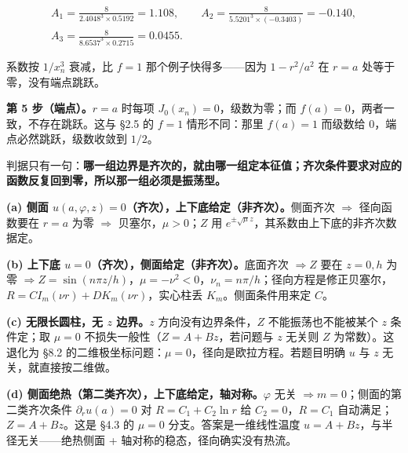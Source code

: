 \documentclass[11pt]{ctexart}
\begin{document}
\begin{gather*}
A_1=\frac{8}{2.4048^3\times0.5192}=1.108,\qquad
A_2=\frac{8}{5.5201^3\times(-0.3403)}=-0.140,\\
A_3=\frac{8}{8.6537^3\times0.2715}=0.0455 .
\end{gather*}

系数按 $1/x_n^3$ 衰减，比 $f=1$ 那个例子快得多——因为 $1-r^2/a^2$ 在 $r=a$ 处等于零，没有端点跳跃。

\textbf{第 5 步（端点）。}$r=a$ 时每项 $J_0(x_n)=0$，级数为零；而 $f(a)=0$，两者一致，不存在跳跃。这与 \S2.5 的 $f=1$ 情形不同：那里 $f(a)=1$ 而级数给 $0$，端点必然跳跃，级数收敛到 $1/2$。


判据只有一句：\textbf{哪一组边界是齐次的，就由哪一组定本征值；齐次条件要求对应的函数反复回到零，所以那一组必须是振荡型。}

\textbf{(a) 侧面 $u(a,\varphi,z)=0$（齐次），上下底给定（非齐次）。}侧面齐次 $\Rightarrow$ 径向函数要在 $r=a$ 为零 $\Rightarrow$ 贝塞尔，$\mu>0$；$Z$ 用 $e^{\pm\sqrt\mu z}$，其系数由上下底的非齐次数据定。

\textbf{(b) 上下底 $u=0$（齐次），侧面给定（非齐次）。}底面齐次 $\Rightarrow Z$ 要在 $z=0,h$ 为零 $\Rightarrow Z=\sin(n\pi z/h)$，$\mu=-\nu^2<0$，$\nu_n=n\pi/h$；径向方程是修正贝塞尔，$R=C I_m(\nu r)+D K_m(\nu r)$，实心柱丢 $K_m$。侧面条件用来定 $C$。

\textbf{(c) 无限长圆柱，无 $z$ 边界。}$z$ 方向没有边界条件，$Z$ 不能振荡也不能被某个 $z$ 条件定；取 $\mu=0$ 不损失一般性（$Z=A+Bz$，若问题与 $z$ 无关则 $Z$ 为常数）。这退化为 \S8.2 的二维极坐标问题：$\mu=0$，径向是欧拉方程。若题目明确 $u$ 与 $z$ 无关，就直接按二维做。

\textbf{(d) 侧面绝热（第二类齐次），上下底给定，轴对称。}$\varphi$ 无关 $\Rightarrow m=0$；侧面的第二类齐次条件 $\partial_ru(a)=0$ 对 $R=C_1+C_2\ln r$ 给 $C_2=0$，$R=C_1$ 自动满足；$Z=A+Bz$。这是 \S4.3 的 $\mu=0$ 分支。答案是一维线性温度 $u=A+Bz$，与半径无关——绝热侧面 + 轴对称的稳态，径向确实没有热流。

\end{document}
